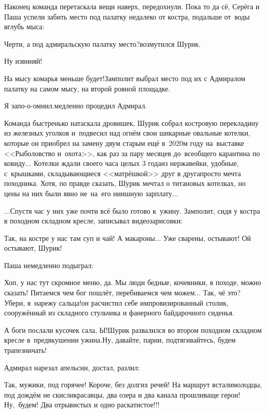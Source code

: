 Наконец команда перетаскала вещи наверх, передохнули. Пока то да сё, Серёга и Паша успели забить место под палатку недалеко от костра, подальше от~воды вглубь мыса:

\diagdash Черти, а под адмиральскую палатку место?\mdash возмутился Шурик.

\diagdash Ну извиняй!

\diagdash На мысу комарья меньше будет!\mdash Замполит выбрал место под их с Адмиралом палатку на самом мысу, на второй ровной площадке.

\diagdash Я запо-о-омнил.\mdash медленно процедил Адмирал.

Команда быстренько натаскала дровишек, Шурик собрал костровую перекладину из железных уголков и~подвесил над огнём свои шикарные овальные котелки, которые он приобрел на замену двум старым ещё в~2020\sdash м году на~выставке <<Рыболовство и~охота>>, как раз за пару месяцев до~всеобщего карантина по ковиду$\ldots$ Котелки ждали своего часа целых 3 года\mdash из нержавейки, удобные, с~крышками, складывающиеся <<матрёшкой>> друг в друга\mdash просто мечта походника. Хотя, по правде сказать, Шурик мечтал о титановых котелках, но цены на них были явно не~на~его нии\sdash шную зарплату$\ldots$

$\ldots$Спустя час у них уже почти всё было готово к~ужину. %
Замполит, сидя у костра в походном складном кресле, записывал видеозарисовки:

\diagdash Так, на костре у нас там суп и чай! А макароны$\ldots$ Уже сварены, остывают! Ой остывают, Шурик!

Паша немедленно подыграл:

\diagdash Хоп, у нас тут скромное меню, да. Мы люди бедные, кочевники, в походе, можно сказать! Питаемся чем бог пошлёт, перебиваемся чем можем$\ldots$ Так, чё это? Убери, я~нарежу сальца!\mdash он расчистил себе импровизированный столик, сооружённый из складного стульчика и фанерного байдарочного сиденья.

\diagdash А боги послали кусочек сала, Ы!\mdash Шурик развалился во втором походном складном кресле в~предвкушении ужина.\mdash Ну, давайте, парни, подтягивайтесь, будем трапезничать!

Адмирал нарезал апельсин, достал, разлил: 

\diagdash Так, мужики, под горячее! Короче, без долгих речей! На маршрут встали\mdash молодцы, под дождём не скисли\mdash красавцы, два озера и два канала прошли\mdash ваще герои! Ну,~будем! Два отрывистых и одно раскатистое!!!

